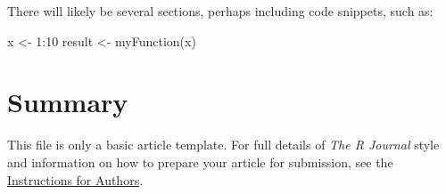 There will likely be several sections, perhaps including code snippets, such as:

\begin{example}
  x <- 1:10
  result <- myFunction(x)
\end{example}

\section{Summary}

This file is only a basic article template. For full details of \emph{The R Journal} style and information on how to prepare your article for submission, see the \href{http://journal.r-project.org/share/author-guide.pdf}{Instructions for Authors}.



\address{Author One\\
  Affiliation\\
  Address\\
  Country\\}

\address{Author Two\\
  Affiliation\\
  Address\\
  Country\\}

\address{Author Three\\
  Affiliation\\
  Address\\
  Country\\}
